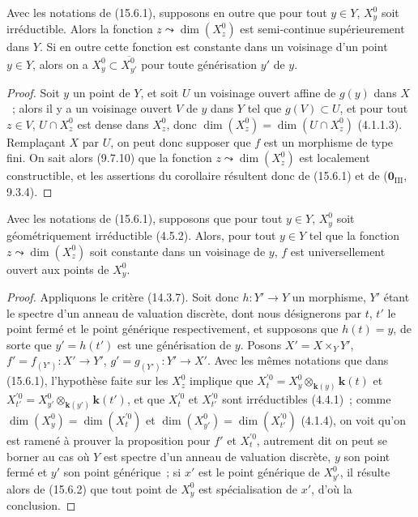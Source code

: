 \begin{corollary}[15.6.2]
Avec les notations de \textup{(15.6.1)}, supposons en outre que pour tout $y\in Y$, $X_y^0$ soit irréductible. Alors la fonction $z\leadsto\dim(X_z^0)$ est semi-continue supérieurement dans $Y$. Si en outre cette fonction est constante dans un voisinage d'un point $y\in Y$, alors on a $X_y^0\subset\overline{X_{y'}^0}$ pour toute générisation $y'$ de $y$.
\end{corollary}

\begin{proof}
Soit $y$ un point de $Y$, et soit $U$ un voisinage ouvert affine de $g(y)$ dans $X$~; alors il y a un voisinage ouvert $V$ de $y$ dans $Y$ tel que $g(V)\subset U$, et pour tout $z\in V$, $U\cap X_z^0$ est dense dans $X_z^0$, donc $\dim(X_z^0)=\dim(U\cap X_z^0)$ (4.1.1.3). Remplaçant $X$ par $U$, on peut donc supposer que $f$ est un morphisme de type fini. On sait alors (9.7.10) que la fonction $z\leadsto\dim(X_z^0)$ est localement constructible, et les assertions du corollaire résultent donc de (15.6.1) et de ($\mathbf{0}_{\mathrm{III}}$, 9.3.4).
\end{proof}

\begin{proposition}[15.6.3]
\label{IV.15.6.3-fr}
Avec les notations de \textup{(15.6.1)}, supposons que pour tout $y\in Y$, $X_y^0$ soit géométriquement irréductible \textup{(4.5.2)}. Alors, pour tout $y\in Y$ tel que la fonction $z\leadsto\dim(X_z^0)$ soit constante dans un voisinage de $y$, $f$ est universellement ouvert aux points de $X_y^0$.
\end{proposition}

\begin{proof}
Appliquons le critère (14.3.7). Soit donc $h:Y'\to Y$ un morphisme, $Y'$ étant le spectre d'un anneau de valuation discrète, dont nous désignerons par $t$, $t'$ le point fermé et le point générique respectivement, et supposons que $h(t)=y$, de sorte que $y'=h(t')$ est une générisation de $y$. Posons $X'=X\times_Y Y'$, $f'=f_{(Y')}:X'\to Y'$, $g'=g_{(Y')}:Y'\to X'$. Avec les mêmes notations que dans (15.6.1), l'hypothèse faite sur les $X_z^0$ implique que
$X_t^{\prime 0}=X_y^0\otimes_{\mathbf{k}(y)}\boldsymbol{k}(t)$ et
$X_{t'}^{\prime 0}=X_{y'}^0\otimes_{\mathbf{k}(y')}\boldsymbol{k}(t')$,
et que $X_t^{\prime 0}$ et $X_{t'}^{\prime 0}$ sont irréductibles (4.4.1)~; comme $\dim(X_y^0)=\dim(X_t^{\prime 0})$ et $\dim(X_{y'}^0)=\dim(X_{t'}^{\prime 0})$ (4.1.4), on voit qu'on est ramené à prouver la proposition pour $f'$ et $X_t^{\prime 0}$, autrement dit on peut se borner au cas où $Y$ est spectre d'un anneau de valuation discrète, $y$ son point fermé et $y'$ son point générique~; si $x'$ est le point générique de $X_{y'}^0$, il résulte alors de (15.6.2) que tout point de $X_y^0$ est spécialisation de $x'$, d'où la conclusion.
\end{proof}

